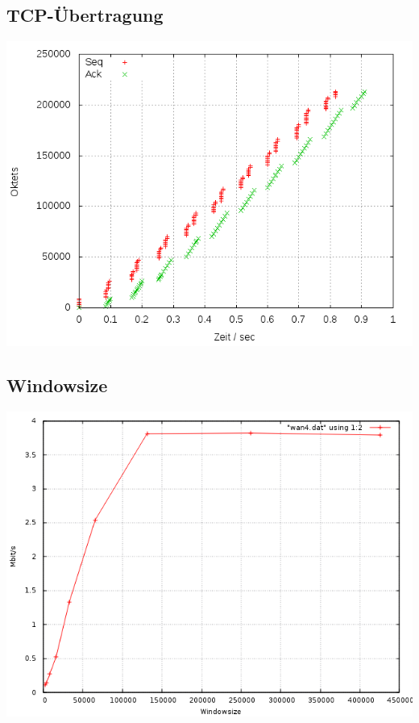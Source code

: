 \documentclass[a4paper,10pt]{article}
\begin{document}
\subsection{TCP-Übertragung}
\includegraphics[scale=0.75]{setup_wan4.png}

\subsection{Windowsize}
\includegraphics[scale=0.75]{wan4_windows.png}
\end{document}
